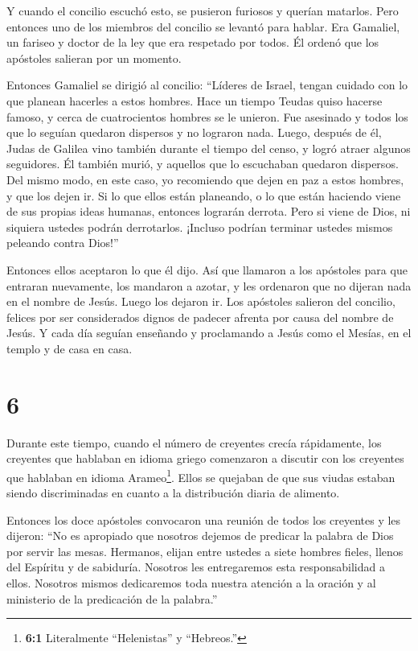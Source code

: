  Y cuando el concilio escuchó esto, se pusieron furiosos y
querían matarlos.  Pero entonces uno de los miembros del
concilio se levantó para hablar. Era Gamaliel, un fariseo y doctor de la
ley que era respetado por todos. Él ordenó que los apóstoles salieran
por un momento.

 Entonces Gamaliel se dirigió al concilio: ``Líderes de
Israel, tengan cuidado con lo que planean hacerles a estos hombres.
 Hace un tiempo Teudas quiso hacerse famoso, y cerca de
cuatrocientos hombres se le unieron. Fue asesinado y todos los que lo
seguían quedaron dispersos y no lograron nada.  Luego,
después de él, Judas de Galilea vino también durante el tiempo del
censo, y logró atraer algunos seguidores. Él también murió, y aquellos
que lo escuchaban quedaron dispersos.  Del mismo modo, en
este caso, yo recomiendo que dejen en paz a estos hombres, y que los
dejen ir. Si lo que ellos están planeando, o lo que están haciendo viene
de sus propias ideas humanas, entonces lograrán derrota. 
Pero si viene de Dios, ni siquiera ustedes podrán derrotarlos. ¡Incluso
podrían terminar ustedes mismos peleando contra Dios!''

 Entonces ellos aceptaron lo que él dijo. Así que llamaron
a los apóstoles para que entraran nuevamente, los mandaron a azotar, y
les ordenaron que no dijeran nada en el nombre de Jesús. Luego los
dejaron ir.  Los apóstoles salieron del concilio, felices
por ser considerados dignos de padecer afrenta por causa del nombre de
Jesús.  Y cada día seguían enseñando y proclamando a Jesús
como el Mesías, en el templo y de casa en casa.

\hypertarget{section-5}{%
\section{6}\label{section-5}}

 Durante este tiempo, cuando el número de creyentes crecía
rápidamente, los creyentes que hablaban en idioma griego comenzaron a
discutir con los creyentes que hablaban en idioma Arameo\footnote{\textbf{6:1}
  Literalmente ``Helenistas'' y ``Hebreos.''}. Ellos se quejaban de que
sus viudas estaban siendo discriminadas en cuanto a la distribución
diaria de alimento.

 Entonces los doce apóstoles convocaron una reunión de todos
los creyentes y les dijeron: ``No es apropiado que nosotros dejemos de
predicar la palabra de Dios por servir las mesas.  Hermanos,
elijan entre ustedes a siete hombres fieles, llenos del Espíritu y de
sabiduría. Nosotros les entregaremos esta responsabilidad a ellos.
 Nosotros mismos dedicaremos toda nuestra atención a la
oración y al ministerio de la predicación de la palabra.''

